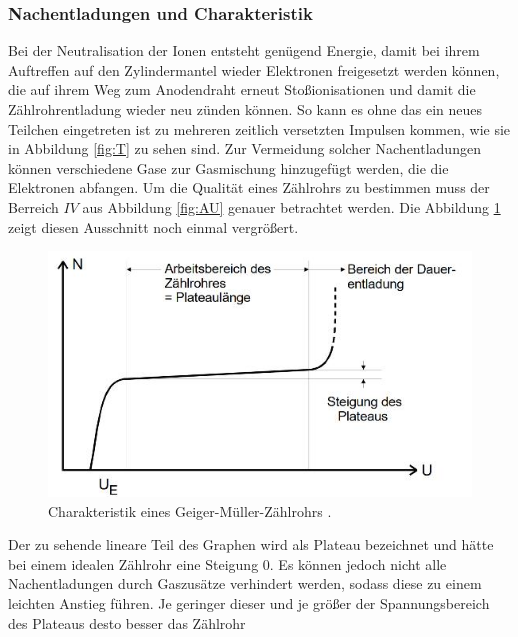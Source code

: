 \subsubsection{Nachentladungen und Charakteristik}
Bei der Neutralisation der Ionen entsteht genügend Energie, damit bei ihrem Auftreffen auf den Zylindermantel wieder Elektronen freigesetzt werden können, die auf ihrem Weg zum Anodendraht erneut Stoßionisationen  und damit die Zählrohrentladung wieder neu zünden können.
So kann es ohne das ein neues Teilchen eingetreten ist zu mehreren zeitlich versetzten Impulsen kommen, wie sie in Abbildung \ref{fig:T} zu sehen sind. Zur Vermeidung solcher Nachentladungen können verschiedene Gase zur Gasmischung hinzugefügt werden, die die Elektronen abfangen.\newline
Um die Qualität eines Zählrohrs zu bestimmen muss der Berreich $IV$ aus Abbildung \ref{fig:AU} genauer betrachtet werden. Die Abbildung \ref{fig:AU2} zeigt diesen Ausschnitt noch einmal vergrößert.
\begin{figure}
\centering
\includegraphics[scale=0.5]{content/images/AU2.jpg}
\caption{Charakteristik eines Geiger-Müller-Zählrohrs \cite{V703}.}
\label{fig:AU2}
\end{figure}
Der zu sehende lineare Teil des Graphen wird als Plateau bezeichnet und hätte bei einem idealen Zählrohr eine Steigung 0.
Es können jedoch nicht alle Nachentladungen durch Gaszusätze verhindert werden, sodass diese zu einem leichten Anstieg führen.
Je geringer dieser und je größer der Spannungsbereich des Plateaus desto besser das Zählrohr
